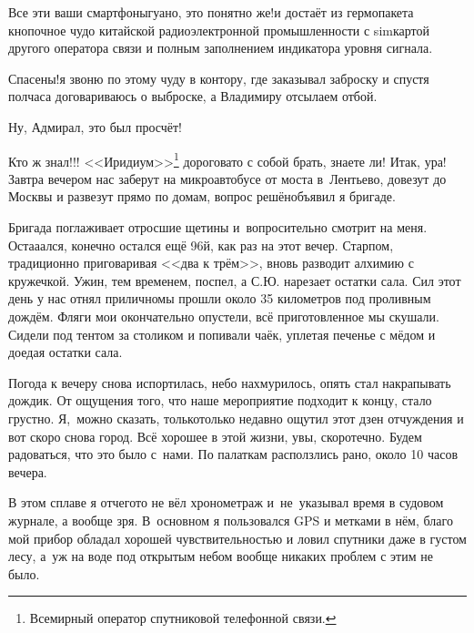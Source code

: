 \diagdash Все эти ваши смартфоны\mdash гуано, это понятно же!\mdash и достаёт из гермопакета кнопочное чудо китайской радиоэлектронной промышленности с sim\sdash картой другого оператора связи и полным заполнением индикатора уровня сигнала.

\diagdash Спасены!\mdash я звоню по этому чуду в контору, где заказывал заброску и спустя полчаса договариваюсь о выброске, а Владимиру отсылаем отбой. 

\diagdash Ну, Адмирал, это был просчёт! 

\diagdash Кто ж знал!!! <<Иридиум>>\footnote[1]{Всемирный оператор спутниковой телефонной связи.} дороговато с собой брать, знаете ли! Итак, ура! Завтра вечером нас заберут на микроавтобусе от моста в~Лентьево, довезут до Москвы и развезут прямо по домам, вопрос решён\mdash объявил я бригаде.

Бригада поглаживает отросшие щетины и~вопросительно смотрит на меня. Оста\sdash а\sdash ался, конечно остался ещё 96\sdash й, как раз на этот вечер. Старпом, традиционно приговаривая <<два к трём>>, вновь разводит алхимию с кружечкой. Ужин, тем временем, поспел, а С.Ю. нарезает остатки сала. Сил этот день у нас отнял прилично\mdash мы прошли около 35 километров под проливным дождём. Фляги мои окончательно опустели, всё приготовленное мы скушали. Сидели под тентом за столиком и попивали чаёк, уплетая печенье с мёдом и доедая остатки сала. 

Погода к вечеру снова испортилась, небо нахмурилось, опять стал накрапывать дождик. От ощущения того, что наше мероприятие подходит к концу, стало грустно. Я,~можно сказать, только\sdash только недавно ощутил этот дзен отчуждения и вот скоро снова город. Всё хорошее в этой жизни, увы, скоротечно. Будем радоваться, что это было с~нами. По палаткам расползлись рано, около 10 часов вечера. 

В этом сплаве я отчего\sdash то не вёл хронометраж и~не~указывал время в судовом журнале, а вообще зря. В~основном я пользовался GPS и метками в нём, благо мой прибор обладал хорошей чувствительностью и ловил спутники даже в густом лесу, а~уж на воде под открытым небом вообще никаких проблем с этим не было.

\begin{center}
\end{center}
